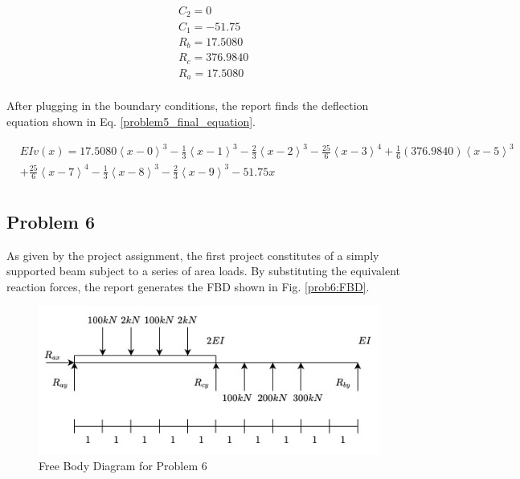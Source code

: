 \documentclass[a4paper]{article}
\begin{document}
\begin{equation}
\begin{split}
	& C_2 = 0 \\
	& C_1 = -51.75 \\
	& R_b = 17.5080 \\
	& R_c = 376.9840\\
	& R_a = 17.5080 \\
\end{split}
\label{problem5_constants_of_integration_solution}
\end{equation}

After plugging in the boundary conditions, the report finds the deflection equation shown in Eq. \ref{problem5_final_equation}.

\begin{equation}
\begin{split}
& EI v(x) = 17.5080\left<x-0\right>^3 - \frac{1}{3}\left<x-1\right>^3 -  \frac{2}{3}\left<x-2\right>^3 - \frac{25}{6}\left<x-3\right>^4 + \frac{1}{6}(376.9840)\left<x-5\right>^3 \\
&  + \frac{25}{6}\left<x-7\right>^4 - \frac{1}{3}\left<x-8\right>^3 -  \frac{2}{3}\left<x-9\right>^3  -51.75x\\
\end{split}
\label{problem5_final_equation}
\end{equation}



\subsection{Problem 6}

As given by the project assignment, the first project constitutes of a simply supported beam subject to a series of area loads. By substituting the equivalent reaction forces, the report generates the FBD shown in Fig. \ref{prob6:FBD}.

\begin{figure}[h]
\includegraphics[width=\textwidth]{FBD/FBD_6.jpg}
\caption{Free Body Diagram for Problem 6}
\label{FBD_6}
\end{figure}
\end{document}
